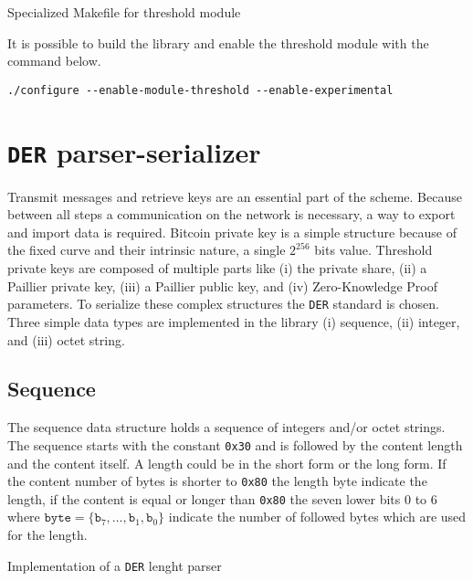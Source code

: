\begin{listing}
	\caption{Specialized Makefile for threshold module}
	\label{lst:specializedMakefile}
\end{listing}

It is possible to build the library and enable the threshold module with the
command below.

\begin{verbatim}
./configure --enable-module-threshold --enable-experimental
\end{verbatim}


\section{\texttt{DER} parser-serializer}

Transmit messages and retrieve keys are an essential part of the scheme. Because
between all steps a communication on the network is necessary, a way to export
and import data is required. Bitcoin private key is a simple structure because
of the fixed curve and their intrinsic nature, a single $2^{256}$ bits value.
Threshold private keys are composed of multiple parts like (i) the private
share, (ii) a Paillier private key, (iii) a Paillier public key, and (iv)
Zero-Knowledge Proof parameters. To serialize these complex structures the
\texttt{DER} standard is chosen. Three simple data types are implemented in the
library (i) sequence, (ii) integer, and (iii) octet string.

\subsection{Sequence}

The sequence data structure holds a sequence of integers and/or octet strings.
The sequence starts with the constant \texttt{0x30} and is followed by the
content length and the content itself. A length could be in the short form or
the long form. If the content number of bytes is shorter to \texttt{0x80} the
length byte indicate the length, if the content is equal or longer than
\texttt{0x80} the seven lower bits 0 to 6 where $\texttt{byte} = \{
\texttt{b}_7, \dots, \texttt{b}_1, \texttt{b}_0\}$ indicate the number of
followed bytes which are used for the length.

\begin{listing}
	\caption{Implementation of a \texttt{DER} lenght parser}
	\label{lst:implDERLenghtParser}
\end{listing}

